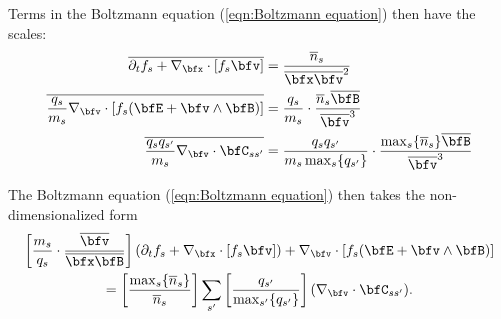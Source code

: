     Terms in the Boltzmann equation (\ref{eqn:Boltzmann equation}) then have the scales:
    \begin{align}
        \overline{\partial_{t}f_{s} + \nabla_{\bfx}\cdot[f_{s}\bfv]}  &=  \frac{\overline{n}_{s}}{\overline{\bfx}\overline{\bfv}^{2}}  \\
        \overline{\frac{q_{s}}{m_{s}}\nabla_{\bfv}\cdot[f_{s}(\bfE + \bfv\wedge\bfB)]}  &=  \frac{q_{s}}{m_{s}}\cdot\frac{\overline{n}_{s}\overline{\bfB}}{\overline{\bfv}^{3}}  \\
        \overline{\frac{q_{s}q_{s'}}{m_{s}}\nabla_{\bfv}\cdot\bfC_{ss'}}  &=  \frac{q_{s}q_{s'}}{m_{s}\max_{s}\{q_{s'}\}}\cdot\frac{\max_{s}\{\overline{n}_{s}\}\overline{\bfB}}{\overline{\bfv}^{3}}
    \end{align}

    The Boltzmann equation (\ref{eqn:Boltzmann equation}) then takes the non-dimensionalized form
    \begin{multline}\label{eqn:non-dim Boltzmann general}
        \left[\frac{m_{s}}{q_{s}}\cdot\frac{\overline{\bfv}}{\overline{\bfx}\overline{\bfB}}\right](\partial_{t}f_{s} + \nabla_{\bfx}\cdot[f_{s}\bfv]) + \nabla_{\bfv}\cdot[f_{s}(\bfE + \bfv\wedge\bfB)]  \\
        =  \left[\frac{\max_{s}\{\overline{n}_{s}\}}{\overline{n}_{s}}\right]\sum_{s'}\left[\frac{q_{s'}}{\max_{s'}\{q_{s'}\}}\right](\nabla_{\bfv}\cdot\bfC_{ss'}).
    \end{multline}
    
